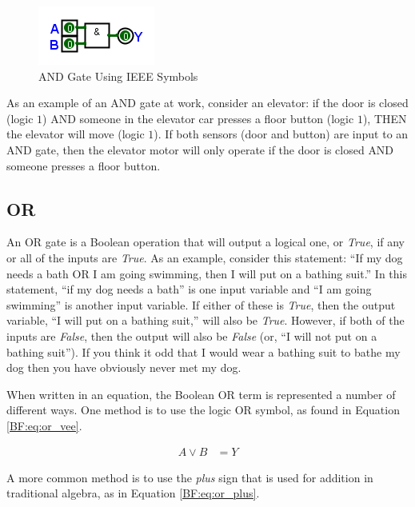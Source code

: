 
\begin{figure}[H]
	\centering
	\includegraphics[width=\maxwidth{.95\linewidth}]{gfx/04_02}
	\caption{AND Gate Using IEEE Symbols}
	\label{fig:04_02}
\end{figure}

As an example of an \textsf{AND}  gate at work, consider an elevator: if the door is closed (logic $ 1 $) \textsf{AND} someone in the elevator car presses a floor button (logic $ 1 $), THEN the elevator will move (logic $ 1 $). If both sensors (door and button) are input to an \textsf{AND}  gate, then the elevator motor will only operate if the door is closed \textsf{AND}  someone presses a floor button. 

\subsection{OR}
\label{BF:subsec:or}

An \textsf{OR}  gate is a Boolean operation that will output a logical one, or \emph{True}, if any or all of the inputs are \emph{True}. As an example, consider this statement: ``If my dog needs a bath OR I am going swimming, then I will put on a bathing suit.'' In this statement, ``if my dog needs a bath'' is one input variable and ``I am going swimming'' is another input variable. If either of these is \emph{True}, then the output variable, ``I will put on a bathing suit,'' will also be \emph{True}. However, if both of the inputs are \emph{False}, then the output will also be \emph{False} (or, ``I will not put on a bathing suit''). If you think it odd that I would wear a bathing suit to bathe my dog then you have obviously never met my dog. 

When written in an equation, the Boolean \textsf{OR}  term is represented a number of different ways. One method is to use the logic \textsf{OR}  symbol, as found in Equation \ref{BF:eq:or_vee}.

\begin{align}
  \label{BF:eq:or_vee}
  A \vee B &= Y 
\end{align}

A more common method is to use the \emph{plus} sign that is used for addition in traditional algebra, as in Equation \ref{BF:eq:or_plus}.


